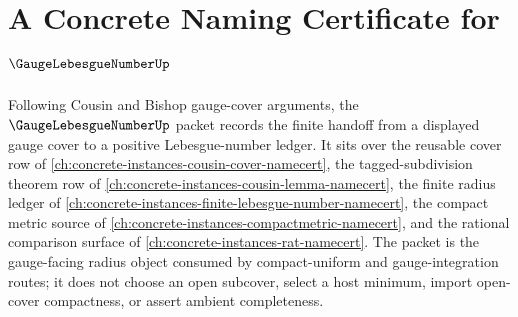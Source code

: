 \chapter{A Concrete Naming Certificate for $\GaugeLebesgueNumberUp$}
\label{ch:concrete-instances-gauge-lebesgue-number-namecert}

Following Cousin and Bishop gauge-cover arguments, the $\GaugeLebesgueNumberUp$ packet records the finite handoff from a displayed gauge cover to a positive Lebesgue-number ledger. It sits over the reusable cover row of \autoref{ch:concrete-instances-cousin-cover-namecert}, the tagged-subdivision theorem row of \autoref{ch:concrete-instances-cousin-lemma-namecert}, the finite radius ledger of \autoref{ch:concrete-instances-finite-lebesgue-number-namecert}, the compact metric source of \autoref{ch:concrete-instances-compactmetric-namecert}, and the rational comparison surface of \autoref{ch:concrete-instances-rat-namecert}. The packet is the gauge-facing radius object consumed by compact-uniform and gauge-integration routes; it does not choose an open subcover, select a host minimum, import open-cover compactness, or assert ambient completeness.

